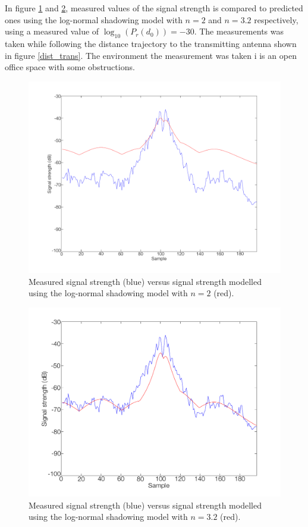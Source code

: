 \documentclass{LTHthesis}
\begin{document}
In figure \ref{log_norm_n_2} and \ref{log_norm_n_3_2}, measured values of the signal strength is compared to predicted ones using the log-normal shadowing model with $n=2$ and $n=3.2$ respectively, using a measured value of $\log_{10}({P_r(d_0)})= -30$. The measurements was taken while following the distance trajectory to the transmitting antenna shown in figure \ref{dist_trans}. The environment the measurement was taken i is an open office space with some obstructions.
%
\begin{figure}[!hbt]

\includegraphics[width=1\textwidth ]{images/signal_model/log_norm_n_2}
\caption{Measured signal strength (blue) versus signal strength modelled using the log-normal shadowing model with $n=2$ (red).}\label{log_norm_n_2}
\end{figure}
%
\begin{figure}[!hbt]

\includegraphics[width=1\textwidth ]{images/signal_model/log_norm_n_3_2}
\caption{Measured signal strength (blue) versus signal strength modelled using the log-normal shadowing model with $n=3.2$ (red).}\label{log_norm_n_3_2}
\end{figure}
\end{document}
